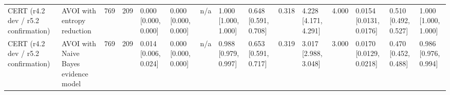 \begin{table}[!ht]
{\begin{tabular}{lllllllllllllll}
CERT (r4.2 dev / r5.2 confirmation) & AVOI with entropy reduction & 769 & 209 & 0.000 [0.000, 0.000] & 0.000 [0.000, 0.000] & n/a & 1.000 [1.000, 1.000] & 0.648 [0.591, 0.708] & 0.318 & 4.228 [4.171, 4.291] & 4.000 & 0.0154 [0.0131, 0.0176] & 0.510 [0.492, 0.527] & 1.000 [1.000, 1.000] \\
CERT (r4.2 dev / r5.2 confirmation) & AVOI with Naive Bayes evidence model & 769 & 209 & 0.014 [0.006, 0.024] & 0.000 [0.000, 0.000] & n/a & 0.988 [0.979, 0.997] & 0.653 [0.591, 0.717] & 0.319 & 3.017 [2.988, 3.048] & 3.000 & 0.0170 [0.0129, 0.0218] & 0.470 [0.452, 0.488] & 0.986 [0.976, 0.994] \\
\bottomrule
\end{tabular}}
\end{table}
